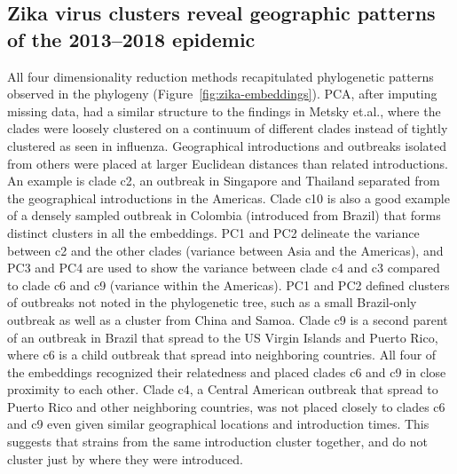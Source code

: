 \documentclass[9pt,lineno]{elife}
\begin{document}
\subsection*{Zika virus clusters reveal geographic patterns of the 2013--2018 epidemic}

All four dimensionality reduction methods recapitulated phylogenetic patterns observed in the phylogeny (Figure~\ref{fig:zika-embeddings}).
PCA, after imputing missing data, had a similar structure to the findings in Metsky et.al., where the clades were loosely clustered on a continuum of different clades instead of tightly clustered as seen in influenza.
Geographical introductions and outbreaks isolated from others were placed at larger Euclidean distances than related introductions.
An example is clade c2, an outbreak in Singapore and Thailand separated from the geographical introductions in the Americas.
Clade c10 is also a good example of a densely sampled outbreak in Colombia (introduced from Brazil) that forms distinct clusters in all the embeddings.
PC1 and PC2 delineate the variance between c2 and the other clades (variance between Asia and the Americas), and PC3 and PC4 are used to show the variance between clade c4 and c3 compared to clade c6 and c9 (variance within the Americas).
PC1 and PC2 defined clusters of outbreaks not noted in the phylogenetic tree, such as a small Brazil-only outbreak as well as a cluster from China and Samoa.
Clade c9 is a second parent of an outbreak in Brazil that spread to the US Virgin Islands and Puerto Rico, where c6 is a child outbreak that spread into neighboring countries.
All four of the embeddings recognized their relatedness and placed clades c6 and c9 in close proximity to each other.
Clade c4, a Central American outbreak that spread to Puerto Rico and other neighboring countries, was not placed closely to clades c6 and c9 even given similar geographical locations and introduction times.
This suggests that strains from the same introduction cluster together, and do not cluster just by where they were introduced.
\end{document}
